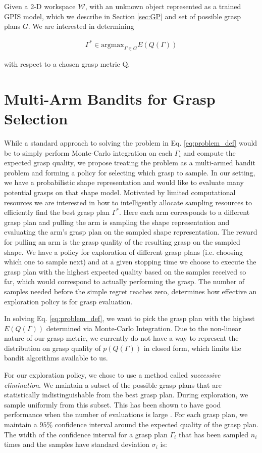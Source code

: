 \documentclass[letterpaper, 10 pt, conference]{ieeeconf}  %
\begin{document}
Given a 2-D workspace $\mathcal{W}$, with an unknown object represented as a trained GPIS model, which we describe in Section \ref{sec:GP} and set of possible grasp plans $G$.
We are interested in determining 

\begin{align}\label{eq:problem_def}
\Gamma^* \in \mbox{argmax}_{\Gamma \in G} E(Q(\Gamma))
\end{align}

with respect to a chosen grasp metric Q. 


\section{Multi-Arm Bandits for Grasp Selection}
While a standard approach to solving the problem in Eq. \ref{eq:problem_def} would be to simply perform Monte-Carlo integration on each $\Gamma_i$ and compute the expected grasp quality, we propose treating the problem as a multi-armed bandit problem and forming a policy for selecting which grasp to sample. 
In our setting, we have a probabilistic shape representation and would like to evaluate many potential grasps on that shape model.
Motivated by limited computational resources we are interested in how to intelligently allocate sampling resources to efficiently find the best grasp plan $\Gamma^*$.
Here each arm corresponds to a different grasp plan and pulling the arm is sampling the shape representation and evaluating the arm's grasp plan on the sampled shape representation.
The reward for pulling an arm is the grasp quality of the resulting grasp on the sampled shape.
We have a policy for exploration of different grasp plans (i.e. choosing which one to sample next) and at a given stopping time we choose to execute the grasp plan with the highest expected quality based on the samples received so far, which would correspond to actually performing the grasp.  
The number of samples needed before the simple regret reaches zero, determines how effective an exploration policy is for grasp evaluation.

In solving Eq. \ref{eq:problem_def}, we want to pick the grasp plan with the highest $E(Q(\Gamma))$ determined via Monte-Carlo Integration.
Due to the non-linear nature of our grasp metric, we currently do not have a way to represent the distribution on grasp quality of $p(Q(\Gamma))$ in closed form, which limits the bandit algorithms available to us. 

For our exploration policy, we chose to use a method called \textit{successive elimination}. We maintain a subset of the possible grasp plans that are statistically indistinguishable from the best grasp plan.
During exploration, we sample uniformly from this subset.
This has been shown to have good performance when the number of evaluations is large \cite{bubeck2009pure}.
For each grasp plan, we maintain a $95\%$ confidence interval around the expected quality of the grasp plan.
The width of the confidence interval for a grasp plan $\Gamma_i$ that has been sampled $n_i$ times and the samples have standard deviation $\sigma_i$ is:
\end{document}
